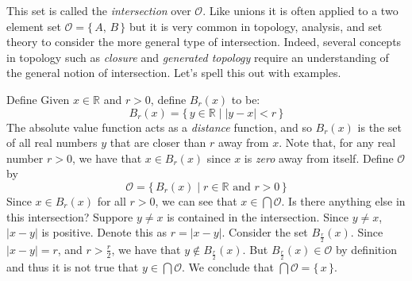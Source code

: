             This set is called the \textit{intersection} over $\mathcal{O}$.
            Like unions it is often applied to a two element set
            $\mathcal{O}=\{\,A,\,B\,\}$ but it is very common in topology,
            analysis, and set theory to consider the more general type of
            intersection. Indeed, several concepts in topology such as
            \textit{closure} and \textit{generated topology} require an
            understanding of the general notion of intersection. Let's spell
            this out with examples.
            \begin{example}
                Define Given $x\in\mathbb{R}$ and $r>0$, define $B_{r}(x)$ to
                be:
                \begin{equation}
                    B_{r}(x)=\{\,y\in\mathbb{R}\;|\;|y-x|<r\,\}
                \end{equation}
                The absolute value function acts as a
                \textit{distance} function, and so $B_{r}(x)$ is the set of
                all real numbers $y$ that are closer than $r$ away from $x$.
                Note that, for any real number $r>0$, we have that
                $x\in{B}_{r}(x)$ since $x$ is \textit{zero} away from itself.
                Define $\mathcal{O}$ by
                \begin{equation}
                    \mathcal{O}=\{\,B_{r}(x)\;|\;r\in\mathbb{R}\textrm{ and }
                        r>0\,\}
                \end{equation}
                Since $x\in{B}_{r}(x)$ for all $r>0$, we can see that
                $x\in\bigcap\mathcal{O}$. Is there anything else in this
                intersection? Suppore $y\ne{x}$ is contained in the
                intersection. Since $y\ne{x}$, $|x-y|$ is positive. Denote this
                as $r=|x-y|$. Consider the set $B_{\frac{r}{2}}(x)$. Since
                $|x-y|=r$, and $r>\frac{r}{2}$, we have that
                $y\notin{B}_{\frac{r}{2}}(x)$. But
                $B_{\frac{r}{2}}(x)\in\mathcal{O}$ by definition and thus it
                is not true that $y\in\bigcap\mathcal{O}$. We conclude that
                $\bigcap\mathcal{O}=\{\,x\,\}$.
            \end{example}
